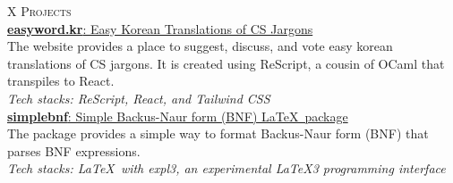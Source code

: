 \documentclass[a4paper,10pt]{memoir}
\begin{document}
\begin{tblr}{X}
  {\Large\textsc{Projects}}                                                                                                                                                                                                                                                                    \\ \hline
  \href{https://easyword.kr/}{\textbf{easyword.kr}: Easy Korean Translations of CS Jargons}                                                                                                                                                                                                    \\
  The website provides a place to suggest, discuss, and vote easy korean translations of CS jargons. It is created using ReScript, a cousin of OCaml that transpiles to React.                                                                                                                 \\
  \textit{Tech stacks: ReScript, React, and Tailwind CSS}                                                                                                                                                                                                                                      \\[0.5\onelineskip]

  \href{https://github.com/Zeta611/simplebnf}{\textbf{simplebnf}: Simple Backus-Naur form (BNF) \LaTeX\ package}                                                                                                                                                                               \\
  The package provides a simple way to format Backus-Naur form (BNF) that parses BNF expressions.                                                                                                                                                                                              \\
  \textit{Tech stacks: \LaTeX\ with \textsf{expl3}, an experimental \LaTeX3 programming interface}                                                                                                                                                                                             \\[0.5\onelineskip]


\end{tblr}
\end{document}
